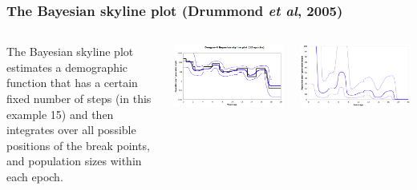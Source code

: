 %
%

\begin{frame}
\frametitle{The Bayesian skyline plot (Drummond {\it et al}, 2005)}

\begin{columns}


The Bayesian skyline plot estimates a demographic function that has a certain fixed number of steps (in this example 15) and then integrates over all possible positions of the break points, and population sizes within each epoch.


\includegraphics[width=\textwidth]{../images/dengueBSPLog}

\includegraphics[width=\textwidth]{../images/dengueBSP}

\end{columns}
\end{frame}

